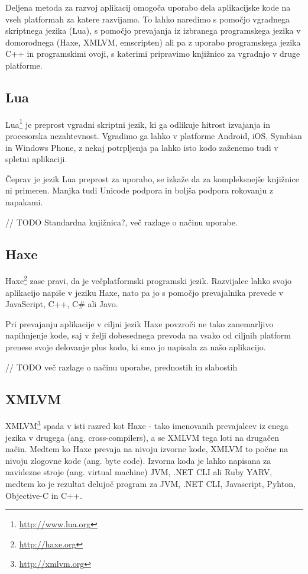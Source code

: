 Deljena metoda za razvoj aplikacij omogoča uporabo dela aplikacijske kode na vseh platformah za katere razvijamo. To lahko naredimo s pomočjo vgradnega skriptnega jezika (Lua), s pomočjo prevajanja iz izbranega programskega jezika v domorodnega (Haxe, XMLVM, emscripten) ali pa z uporabo programskega jezika C++ in programskimi ovoji, s katerimi pripravimo knjižnico za vgradnjo v druge platforme.

\subsection{Lua}

Lua\footnote{\href{http://www.lua.org}{http://www.lua.org}} je preprost vgradni skriptni jezik, ki ga odlikuje hitrost izvajanja in procesorska nezahtevnost. Vgradimo ga lahko v platforme Android, iOS, Symbian in Windows Phone, z nekaj potrpljenja pa lahko isto kodo zaženemo tudi v spletni aplikaciji.

Čeprav je jezik Lua preprost za uporabo, se izkaže da za kompleksnejše knjižnice ni primeren. Manjka tudi Unicode podpora in boljša podpora rokovanju z napakami.

// TODO Standardna knjižnica?, več razlage o načinu uporabe.

\subsection{Haxe}

Haxe\footnote{\href{http://haxe.org}{http://haxe.org}} zase pravi, da je večplatformski programski jezik. Razvijalec lahko svojo aplikacijo napiše v jeziku Haxe, nato pa jo s pomočjo prevajalnika prevede v JavaScript, C++, C\# ali Javo.

Pri prevajanju aplikacije v ciljni jezik Haxe povzroči ne tako zanemarljivo napihnjenje kode, saj v želji dobesednega prevoda na vsako od ciljnih platform prenese svoje delovanje plus kodo, ki smo jo napisala za našo aplikacijo.

// TODO več razlage o načinu uporabe, prednostih in slabostih

\subsection{XMLVM}

XMLVM\footnote{\href{http://xmlvm.org}{http://xmlvm.org}} spada v isti razred kot Haxe - tako imenovanih prevajalcev iz enega jezika v drugega (ang. cross-compilers), a se XMLVM tega loti na drugačen način. Medtem ko Haxe prevaja na nivoju izvorne kode, XMLVM to počne na nivoju zlogovne kode (ang. byte code). Izvorna koda je lahko napisana za navidezne stroje (ang. virtual machine) JVM, .NET CLI ali Ruby YARV, medtem ko je rezultat delujoč program za JVM, .NET CLI, Javascript, Pyhton, Objective-C in C++.


